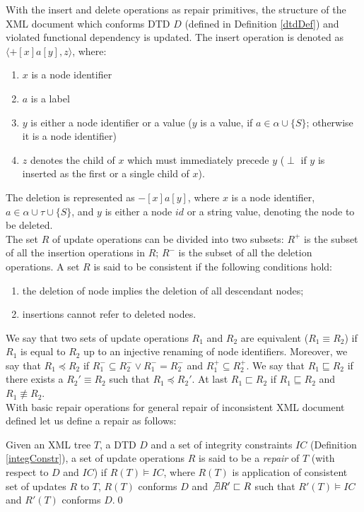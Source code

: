 With the insert and delete operations as repair primitives, the structure of the XML document which conforms DTD $D$ (defined in Definition \ref{dtdDef}) and violated functional dependency is updated. The insert operation is denoted as $\langle  + [x]a[y], z\rangle$, where:
\begin{enumerate}
\renewcommand{\labelenumi}{\roman{enumi})}
	\item $x$ is a node identifier
    \item $a$ is a label
    \item $y$ is either a node identifier or a value ($y$ is a value, if $a \in \alpha \cup \{S\}$; otherwise it is a node identifier)
    \item $z$ denotes the child of $x$ which must immediately precede $y$ ($\perp$ if $y$ is inserted as the first or a single child of $x$).
\end{enumerate}

The deletion is represented as $-[x]a[y]$, where $x$ is a node identifier, $a \in \alpha \cup \tau \cup \{S\}$, and $y$ is either a node $id$ or a string value, denoting the node to be deleted.\\
The set $R$ of update operations can be divided into two subsets: $R^+$ is the subset of all the insertion operations in $R$; $R^-$ is the subset of all the deletion operations. A set $R$ is said to be consistent if the following conditions hold:
\begin{enumerate}
	\item the deletion of node implies the deletion of all descendant nodes;
    \item insertions cannot refer to deleted nodes.
\end{enumerate}
We say that two sets of update operations $R_1$ and $R_2$ are equivalent ($R_1 \equiv R_2$) if $R_1$ is equal to $R_2$ up to an injective renaming of node identifiers. Moreover, we say that $R_1 \preceq R_2$ if $R_1^- \subseteq R_2^- \lor R_1^- = R_2^-$ and $R_1^+ \subseteq R_2^+$. We say that $R_1 \sqsubseteq R_2$ if there exists a $R_2' \equiv R_2$ such that  $R_1 \preceq R_2'$. At last $R_1 \sqsubset R_2$ if $R_1 \sqsubseteq R_2$ and $R_1 \not \equiv R_2$.\\

With basic repair operations for general repair of inconsistent XML document defined let us define a repair as follows:

\begin{define}[Repair]
Given an XML tree $T$, a DTD $D$ and a set of integrity constraints $IC$ (Definition \ref{integConstr}), a set of update operations $R$ is said to be a {\sl repair} of $T$ (with respect to $D$ and $IC$) if $R(T) \models IC$, where $R(T)$ is application of consistent set of updates $R$ to $T$, $R(T)$ conforms $D$ and $\not \exists R' \sqsubset R$ such that $R'(T) \models IC$ and $R'(T)$ conforms $D$.\qed
\end{define}

